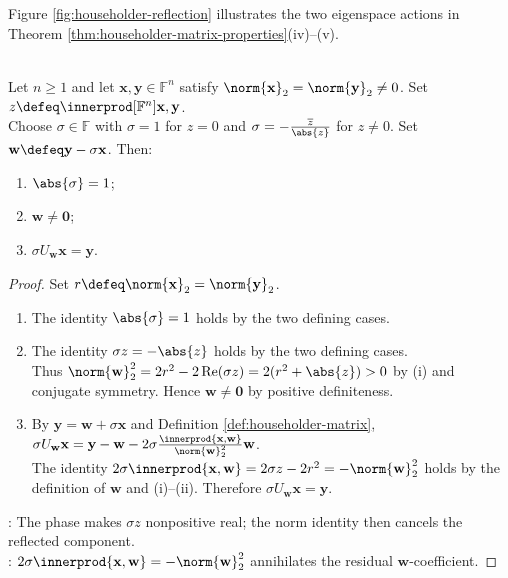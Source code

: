 Figure \ref{fig:householder-reflection} illustrates the two eigenspace actions in Theorem \ref{thm:householder-matrix-properties}(iv)--(v).
\begin{illustrationfigure}[H]
  
  \caption{Householder reflection: $U_{\mathbf{w}}$ preserves the $\mathbf{w}^{\perp}$ component of $\mathbf{x}$ and negates its $\operatorname{span}(\mathbf{w})$ component.}
  \label{fig:householder-reflection}
\end{illustrationfigure}

\begin{theorem} \label{thm:householder-maps-equal-norm-vectors} \\
Let $n\geq1$ and let $\mathbf{x},\mathbf{y}\in\mathbb{F}^n$ satisfy $\norm{\mathbf{x}}_2=\norm{\mathbf{y}}_2\neq0$. Set $z\defeq\innerprod[\mathbb{F}^n]{\mathbf{x},\mathbf{y}}$.\\
Choose $\sigma\in\mathbb{F}$ with $\sigma=1$ for $z=0$ and $\sigma=-\frac{\overline{z}}{\abs{z}}$ for $z\neq0$. Set $\mathbf{w}\defeq\mathbf{y}-\sigma\mathbf{x}$. Then:
\begin{enumerate}[label=(\roman*)]
\setlength{\itemsep}{0pt}
\item $\abs{\sigma}=1$;
\item $\mathbf{w}\neq\mathbf{0}$;
\item $\sigma U_{\mathbf{w}}\mathbf{x}=\mathbf{y}$.
\end{enumerate}
\begin{proof}
Set $r\defeq\norm{\mathbf{x}}_2=\norm{\mathbf{y}}_2$.
\begin{enumerate}[label=(\roman*)]
\setlength{\itemsep}{0pt}
\item The identity $\abs{\sigma}=1$ holds by the two defining cases.
\item The identity $\sigma z=-\abs{z}$ holds by the two defining cases.\\
Thus $\norm{\mathbf{w}}_2^2=2r^2-2\operatorname{Re}(\sigma z)=2(r^2+\abs{z})>0$ by (i) and conjugate symmetry. Hence $\mathbf{w}\neq\mathbf{0}$ by positive definiteness.
\item By $\mathbf{y}=\mathbf{w}+\sigma\mathbf{x}$ and Definition \ref{def:householder-matrix}, $\sigma U_{\mathbf{w}}\mathbf{x}=\mathbf{y}-\mathbf{w}-2\sigma\frac{\innerprod{\mathbf{x},\mathbf{w}}}{\norm{\mathbf{w}}_2^2}\mathbf{w}$.\\
The identity $2\sigma\innerprod{\mathbf{x},\mathbf{w}}=2\sigma z-2r^2=-\norm{\mathbf{w}}_2^2$ holds by the definition of $\mathbf{w}$ and (i)--(ii). Therefore $\sigma U_{\mathbf{w}}\mathbf{x}=\mathbf{y}$.
\end{enumerate}
: The phase makes $\sigma z$ nonpositive real; the norm identity then cancels the reflected component.\\
: $2\sigma\innerprod{\mathbf{x},\mathbf{w}}=-\norm{\mathbf{w}}_2^2$ annihilates the residual $\mathbf{w}$-coefficient.
\end{proof}
\end{theorem}


